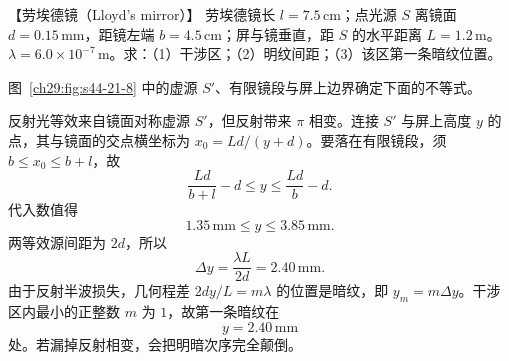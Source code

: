 \begin{origexamplebox}{【劳埃德镜（Lloyd's mirror）】}\label{ch29:ex:s44-21-3}
劳埃德镜长 $l=7.5\,\mathrm{cm}$；点光源 $S$ 离镜面 $d=0.15\,\mathrm{mm}$，距镜左端 $b=4.5\,\mathrm{cm}$；屏与镜垂直，距 $S$ 的水平距离 $L=1.2\,\mathrm m$。$\lambda=6.0\times10^{-7}\,\mathrm m$。求：（1）干涉区；（2）明纹间距；（3）该区第一条暗纹位置。

\begin{center}\begin{minipage}{.96\linewidth}\centering
{}
\end{minipage}\end{center}
\end{origexamplebox}\par\nopagebreak[3]
\begin{xesolution}
\FiniteLloydDiagram
图~\ref{ch29:fig:s44-21-8} 中的虚源 $S'$、有限镜段与屏上边界确定下面的不等式。

反射光等效来自镜面对称虚源 $S'$，但反射带来 $\pi$ 相变。连接 $S'$ 与屏上高度 $y$ 的点，其与镜面的交点横坐标为 $x_0=Ld/(y+d)$。要落在有限镜段，须 $b\le x_0\le b+l$，故
\[
 \frac{Ld}{b+l}-d\le y\le\frac{Ld}{b}-d.
\]
代入数值得
\[
 \boxed{1.35\,\mathrm{mm}\le y\le3.85\,\mathrm{mm}}.
\]
两等效源间距为 $2d$，所以
\[
 \boxed{\Delta y=\frac{\lambda L}{2d}=2.40\,\mathrm{mm}}.
\]
由于反射半波损失，几何程差 $2dy/L=m\lambda$ 的位置是暗纹，即 $y_m=m\Delta y$。干涉区内最小的正整数 $m$ 为 $1$，故第一条暗纹在
\[
 \boxed{y=2.40\,\mathrm{mm}}
\]
处。若漏掉反射相变，会把明暗次序完全颠倒。
\end{xesolution}


